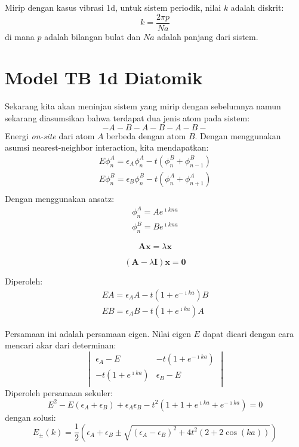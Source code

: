 Mirip dengan kasus vibrasi 1d, untuk sistem periodik, nilai $k$ adalah diskrit:
\begin{equation*}
k = \frac{2\pi p}{Na}
\end{equation*}
di mana $p$ adalah bilangan bulat dan $Na$ adalah panjang dari sistem.


\section{Model TB 1d Diatomik}

Sekarang kita akan meninjau sistem yang mirip dengan sebelumnya
namun sekarang diasumsikan bahwa terdapat dua jenis atom
pada sistem:
\begin{equation*}
- A - B - A - B - A - B -
\end{equation*}
Energi \textit{on-site} dari atom $A$ berbeda dengan atom $B$.
Dengan menggunakan asumsi nearest-neighbor interaction, kita mendapatkan:
\begin{align*}
E \phi_{n}^{A} = \epsilon_{A} \phi_{n}^{A} - t \left( \phi_{n}^{B} + \phi_{n-1}^{B} \right) \\
E \phi_{n}^{B} = \epsilon_{B} \phi_{n}^{B} - t \left( \phi_{n}^{A} + \phi_{n+1}^{A} \right) \\
\end{align*}
Dengan menggunakan ansatz:
\begin{align*}
\phi_{n}^{A} = Ae^{\imath k n a} \\
\phi_{n}^{B} = Be^{\imath k n a}
\end{align*}

\begin{equation*}
\mathbf{A} \mathbf{x} = \lambda \mathbf{x}
\end{equation*}

\begin{equation*}
( \mathbf{A} - \lambda \mathbf{I} ) \mathbf{x} = \mathbf{0}
\end{equation*}
  

Diperoleh:
\begin{align*}
EA = \epsilon_{A} A - t ( 1 + e^{-\imath k a}) B \\
EB = \epsilon_{A} B - t ( 1 + e^{\imath k a}) A
\end{align*}

Persamaan ini adalah persamaan eigen. Nilai eigen $E$ dapat
dicari dengan cara mencari akar dari determinan:
\begin{equation*}
\begin{vmatrix}
\epsilon_{A} - E & -t(1 + e^{-\imath k a}) \\
-t(1 + e^{\imath k a}) & \epsilon_{B} - E \\
\end{vmatrix}
\end{equation*}
Diperoleh persamaan sekuler:
\begin{equation*}
E^2 - E( \epsilon_A + \epsilon_B ) + \epsilon_{A} \epsilon_{B} -
t^2 (1 + 1 + e^{\imath ka} + e^{-\imath ka}) = 0
\end{equation*}
dengan solusi:
\begin{equation*}
E_{\pm}(k) = \frac{1}{2}\left(
\epsilon_{A} + \epsilon_{B} \pm \sqrt{
(\epsilon_{A} - \epsilon_{B})^2 + 4t^2(2 + 2\cos(ka))
}
\right)
\end{equation*}
